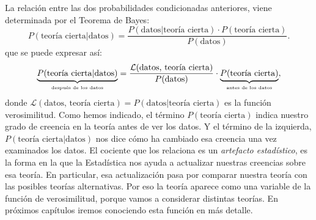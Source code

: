 La relación entre las dos probabilidades condicionadas anteriores, viene determinada por el Teorema de Bayes:
\[
P(\mbox{teoría cierta}|\mbox{datos})=
\dfrac{
P(\mbox{datos}|\mbox{teoría cierta})\cdot P(\mbox{teoría cierta})}{P(\mbox{datos})}.
\]
que se puede expresar así:
\begin{equation}
\label{cap03:ecu:FuncionVerosimilitudBayes}
\underbrace{
P(\mbox{teoría cierta}|\mbox{datos})}_{\mbox{\tiny después de los datos}}=
\dfrac{\mathcal{L}(\mbox{datos, teoría cierta})}{P(\mbox{datos})}
\cdot
\underbrace{
P(\mbox{teoría cierta})}_{\mbox{\tiny antes de los datos}}
,\end{equation}
donde $\mathcal{L}(\mbox{datos, teoría cierta})=P(\mbox{datos}|\mbox{teoría cierta})$ es la {\sf función verosimilitud}. Como hemos indicado, el término $P(\mbox{teoría cierta})$ indica nuestro grado de creencia en la teoría antes de ver los datos. Y el término de la izquierda, $P(\mbox{teoría cierta}|\mbox{datos})$ nos dice cómo ha cambiado esa creencia una vez examinados los datos. El cociente que los relaciona es un {\em artefacto estadístico}, es la forma en la que la Estadística nos ayuda a actualizar nuestras creencias sobre esa teoría. En particular, esa actualización pasa por comparar nuestra teoría con las posibles teorías alternativas. Por eso la teoría aparece como una variable de la función de verosimilitud, porque vamos a considerar distintas teorías. En próximos capítulos iremos conociendo esta función en más detalle.

